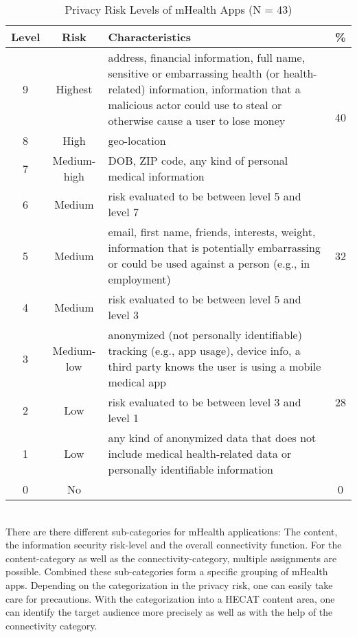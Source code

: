 \begin{table}[!htb]
    \center
    \begin{tabular}{c | c | p{22.5em} | c}
        \textbf{Level} & \textbf{Risk} & \textbf{Characteristics} & \textbf{\%}\\
        \hline
        9 & Highest & address, financial information, full name, sensitive or embarrassing health (or health-related) information, information that a malicious actor could use to steal or otherwise cause a user to lose money & \multirow{3}[20]{*}{40} \\
        \cline{1-3}
        8 & High & geo-location & \\
        \cline{1-3}
        7 & Medium-high & DOB, ZIP code, any kind of personal medical
information & \\
        \hline
        6 & Medium & risk evaluated to be between level 5 and level 7 & \multirow{3}[12]{*}{32} \\
        \cline{1-3}
        5 & Medium & email, first name, friends, interests, weight, information that is potentially embarrassing or could be used against a person (e.g., in employment)\\
        \cline{1-3}
        4 & Medium & risk evaluated to be between level 5 and level 3\\
        \hline
        3 & Medium-low & anonymized (not personally identifiable) tracking (e.g., app usage), device info, a third party knows the user is using a mobile medical app & \multirow{3}[22]{*}{28} \\
        \cline{1-3}
        2 & Low & risk evaluated to be between level 3 and level 1\\
        \cline{1-3}
        1 & Low & any kind of anonymized data that does not include medical
health-related data or personally identifiable information\\
        \hline
        0 & No & & 0 \\
    \end{tabular}
    \caption[Privacy Risk Levels of mHealth Apps]{Privacy Risk Levels of mHealth Apps (N = 43)\footnotemark}
    \label{tab:RiskLevelsmHealth}
\end{table}
\\
There are there different sub-categories for mHealth applications: The content, the information security risk-level and the overall connectivity function. For the content-category as well as the connectivity-category, multiple assignments are possible. Combined these sub-categories form a specific grouping of mHealth apps. Depending on the categorization in the privacy risk, one can easily take care for precautions. With the categorization into a HECAT content area, one can identify the target audience more precisely as well as with the help of the connectivity category.

